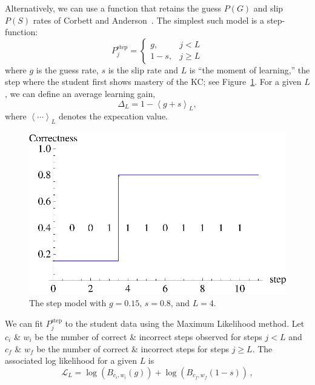 \documentclass[11pt,letterpaper]{article}
\begin{document}
Alternatively, we can use a function that retains the 
guess $P(G)$ and slip $P(S)$ rates of Corbett and 
Anderson~\cite{anderson}.
The simplest such model is a step-function:
%
\begin{equation}
               P_j^\mathrm{step} = \left\{\begin{array}{cc}
                                       g,& j<L\\
				       1-s,& j\ge L
                                    \end{array}\right. \label{step}
\end{equation}
%
where $g$ is the guess rate, $s$ is the slip rate and 
$L$ is ``the moment of learning,'' the step where the student
first shows mastery of the KC; see Figure~\ref{stepf}.
For a given $L$, we can define an average learning gain,
%
\begin{equation}
         \Delta_L = 1- \left\langle g+s \right\rangle_L ,
\end{equation}
%
where $\left\langle \cdots \right\rangle_L$ denotes the
expecation value.
\begin{figure}
\centering    \includegraphics{step.eps}
\caption{The step model with $g=0.15$, $s=0.8$, and $L=4$.}
         \label{stepf}
\end{figure}
%
We can fit $P_j^\mathrm{step} $ to the student data using the
Maximum Likelihood method.
Let $c_i$ \& $w_i$ be the number of correct \& incorrect steps observed
for steps $j<L$ and $c_f$ \& $w_f$ be the number of correct \& incorrect
steps for steps $j\ge L$.  The associated log likelihood for a given $L$ is
%
\begin{equation}
  \mathcal{L}_L  =  \log\left(B_{c_i,w_i}(g)\right) 
                  + \log\left(B_{c_f,w_f}(1-s) \right)  \, ,
		  \label{logLike}
\end{equation}
\end{document}
